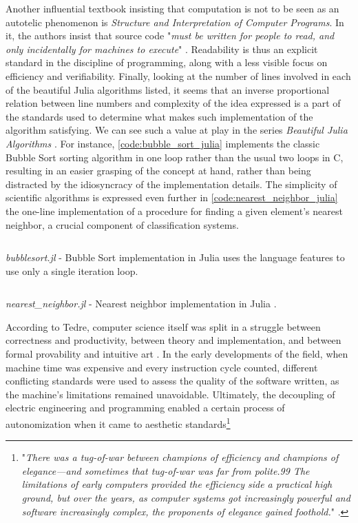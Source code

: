 Another influential textbook insisting that computation is not to be seen as an autotelic phenomenon is \emph{Structure and Interpretation of Computer Programs}. In it, the authors insist that source code "\emph{must be written for people to read, and only incidentally for machines to execute}" \citep{abelson_structure_1979}. Readability is thus an explicit standard in the discipline of programming, along with a less visible focus on efficiency and verifiability. Finally, looking at the number of lines involved in each of the beautiful Julia algorithms listed, it seems that an inverse proportional relation between line numbers and complexity of the idea expressed is a part of the standards used to determine what makes such implementation of the algorithm satisfying. We can see such a value at play in the series \emph{Beautiful Julia Algorithms} \citep{moss_beautifulalgorithms_2022}. For instance, \autoref{code:bubble_sort_julia} implements the classic Bubble Sort sorting algorithm in one loop rather than the usual two loops in C, resulting in an easier grasping of the concept at hand, rather than being distracted by the idiosyncracy of the implementation details. The simplicity of scientific algorithms is expressed even further in \autoref{code:nearest_neighbor_julia} the one-line implementation of a procedure for finding a given element's nearest neighbor, a crucial component of classification systems.

\begin{listing}
  \inputminted{julia}{./corpus/bubblesort.jl}
  \caption{\emph{bubblesort.jl} - Bubble Sort implementation in Julia uses the language features to use only a single iteration loop. \citep{moss_bubblesort_2021}}
  \label{code:bubble_sort_julia}
\end{listing}

\begin{listing}
  \inputminted{julia}{./corpus/nearest_neighbor.jl}
  \caption{\emph{nearest\_neighbor.jl} - Nearest neighbor implementation in Julia \citep{moss_nearestneighbors_2021}.}
  \label{code:nearest_neighbor_julia}
\end{listing}

According to Tedre, computer science itself was split in a struggle between correctness and productivity, between theory and implementation, and between formal provability and intuitive art \citep{tedre_science_2014}. In the early developments of the field, when machine time was expensive and every instruction cycle counted, different conflicting standards were used to assess the quality of the software written, as the machine's limitations remained unavoidable. Ultimately, the decoupling of electric engineering and programming enabled a certain process of autonomization when it came to aesthetic standards\footnote{"\emph{There was a tug-of-war between champions of efficiency and champions of elegance—and sometimes that tug-of-war was far from polite.99 The limitations of early computers provided the efficiency side a practical high ground, but over the years, as computer systems got increasingly powerful and software increasingly complex, the proponents of elegance gained foothold.}" \citep{tedre_science_2014}.}

